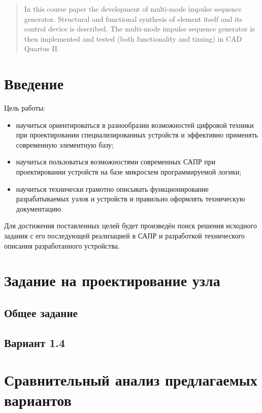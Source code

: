 \documentclass[a4paper,14pt,russian]{article}
\begin{document}
\begin{abstract}
  In this course paper the development of multi-mode impulse sequence generator. Structural and functional synthesis of element itself and its control device is described. The multi-mode impulse sequence generator is then implemented and tested (both functionality and timing) in CAD Quartus II. 
\end{abstract}

\clearpage

\tableofcontents
\clearpage

\section*{Введение}
Цель работы:
\begin{itemize}
\item научиться ориентироваться в разнообразии возможностей цифровой техники при проектировании специализированных устройств и эффективно применять современную элементную базу;
\item научиться пользоваться возможностями современных САПР при проектировании устройств на базе микросхем программируемой логики;
\item научиться технически грамотно описывать функционирование разрабатываемых узлов и устройств и правильно оформлять техническую документацию.
\end{itemize}
Для достижения поставленных целей будет произведён поиск решения исходного задания с его последующей реализацией в САПР и разработкой технического описания разработанного устройства.
\clearpage

\section{Задание на проектирование узла}

\subsection{Общее задание}


\subsection{Вариант 1.4}


\section{Сравнительный анализ предлагаемых вариантов}
\end{document}
